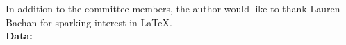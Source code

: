 In addition to the committee members, the author would like to thank Lauren Bachan for sparking interest in \LaTeX{}.\\

\noindent\bf{Data:}  
